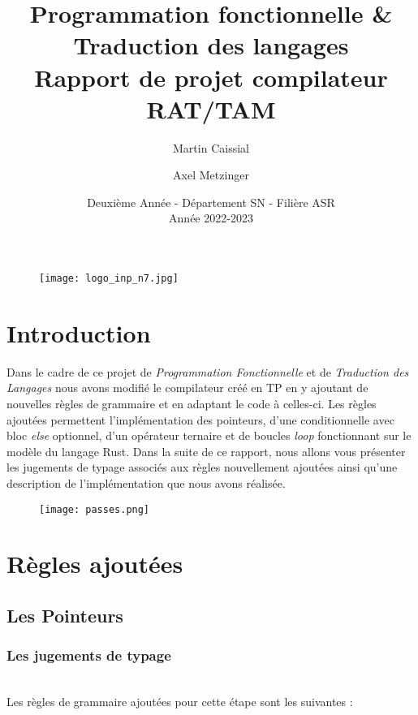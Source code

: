 \documentclass{article}
\begin{document}
\begin{figure}[t]
\vspace{2cm}
\centering
\texttt{[image: logo\_inp\_n7.jpg]}
\end{figure}


\title{\vspace{3cm}Programmation fonctionnelle \& Traduction des langages\\
\textbf{Rapport de projet compilateur RAT/TAM}}
\author{Martin Caissial \and Axel Metzinger}
\date{\vspace{9cm} Deuxième Année - Département SN - Filière ASR\\
Année 2022-2023}
\maketitle
\newpage

\newpage
\tableofcontents
\newpage


\section{Introduction}
Dans le cadre de ce projet de \textit{Programmation Fonctionnelle} et de \textit{Traduction des Langages} nous avons modifié le compilateur créé en TP en y ajoutant de nouvelles règles de grammaire et en adaptant le code à celles-ci. Les règles ajoutées permettent l'implémentation des pointeurs, d'une conditionnelle avec bloc \textit{else} optionnel, d'un opérateur ternaire et de boucles \textit{loop} fonctionnant sur le modèle du langage Rust. Dans la suite de ce rapport, nous allons vous présenter les jugements de typage associés aux règles nouvellement ajoutées ainsi qu'une description de l'implémentation que nous avons réalisée.

\begin{figure}[ht!]
\vspace{2cm}
\centering
\texttt{[image: passes.png]}
\end{figure}




\newpage
\section{Règles ajoutées}
\subsection{Les Pointeurs}
\subsubsection{Les jugements de typage}
\ \\
Les règles de grammaire ajoutées pour cette étape sont les suivantes :
\end{document}
